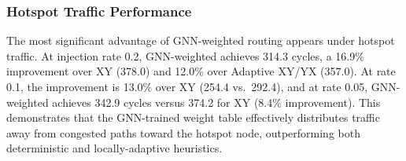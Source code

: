 \begin{table}[h]
\centering
\caption{Average packet latency (cycles) on Mesh $8\times8$ (mean across 3 seeds)}
\label{tab:scalability}
\end{table}

\subsubsection{Hotspot Traffic Performance}

The most significant advantage of GNN-weighted routing appears under hotspot traffic. At injection rate 0.2, GNN-weighted achieves 314.3 cycles, a 16.9\% improvement over XY (378.0) and 12.0\% over Adaptive XY/YX (357.0). At rate 0.1, the improvement is 13.0\% over XY (254.4 vs.~292.4), and at rate 0.05, GNN-weighted achieves 342.9 cycles versus 374.2 for XY (8.4\% improvement). This demonstrates that the GNN-trained weight table effectively distributes traffic away from congested paths toward the hotspot node, outperforming both deterministic and locally-adaptive heuristics.

